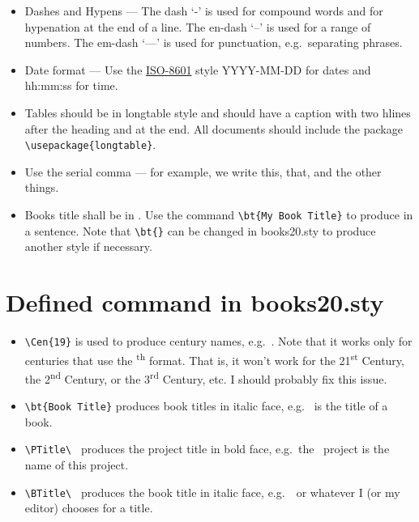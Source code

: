 \documentclass{article}
\begin{document}
\begin{itemize}

\item Dashes and Hypens --- The dash `-' is used for compound words and for
  hypenation at the end of a line.  The en-dash `--' is used for a range
  of numbers. The em-dash `---' is used for punctuation,
  e.g.\ separating phrases.

\item Date format --- Use the
  \href{https://en.wikipedia.org/wiki/ISO_8601}{ISO-8601} style
  YYYY-MM-DD for dates and hh:mm:ss for time.

\item Tables should be in longtable style and should have a caption with two
  hlines after the heading and at the end.  All documents should include
  the package \verb|\usepackage{longtable}|.

\item Use the serial comma --- for example, we write this, that, and the
  other things.

\item Books title shall be in . Use the command
  \verb|\bt{My Book Title}| to produce  in a
  sentence. Note that \verb|\bt{}| can be changed in books20.sty
  to produce another style if necessary.

\end{itemize}


\section{Defined command in books20.sty}

\begin{itemize}

\item \verb|\Cen{19}| is used to produce century names,
  e.g.\ . Note that it works only for centuries that use the
  \textsuperscript{th} format.  That is, it won't work for the
  21\textsuperscript{st} Century, the 2\textsuperscript{nd} Century,
  or the 3\textsuperscript{rd} Century, etc. I should probably fix
  this issue.

\item \verb|\bt{Book Title}| produces book titles in italic face,
e.g.\  is the title of a book.

\item \verb|\PTitle\ | produces the project title in bold face,
  e.g.\ the \PTitle\ project is the name of this project.

\item \verb|\BTitle\ | produces the book title in italic face,
  e.g.\ \BTitle\ or whatever I (or my editor) chooses for a title.

\end{itemize}
\end{document}
